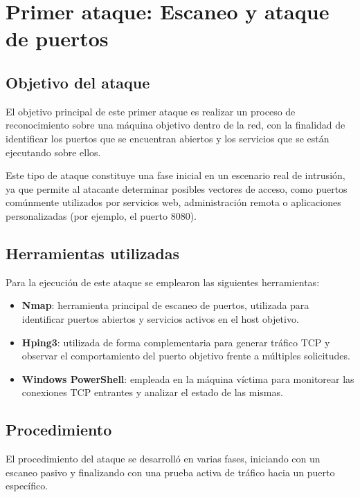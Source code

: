 \section{Primer ataque: Escaneo y ataque de puertos}

\subsection{Objetivo del ataque}

El objetivo principal de este primer ataque es realizar un proceso de reconocimiento sobre una máquina objetivo dentro de la red, con la finalidad de identificar los puertos que se encuentran abiertos y los servicios que se están ejecutando sobre ellos.

Este tipo de ataque constituye una fase inicial en un escenario real de intrusión, ya que permite al atacante determinar posibles vectores de acceso, como puertos comúnmente utilizados por servicios web, administración remota o aplicaciones personalizadas (por ejemplo, el puerto 8080).

\subsection{Herramientas utilizadas}

Para la ejecución de este ataque se emplearon las siguientes herramientas:

\begin{itemize}
    \item \textbf{Nmap}: herramienta principal de escaneo de puertos, utilizada para identificar puertos abiertos y servicios activos en el host objetivo.
    \item \textbf{Hping3}: utilizada de forma complementaria para generar tráfico TCP y observar el comportamiento del puerto objetivo frente a múltiples solicitudes.
    \item \textbf{Windows PowerShell}: empleada en la máquina víctima para monitorear las conexiones TCP entrantes y analizar el estado de las mismas.
\end{itemize}

\subsection{Procedimiento}

El procedimiento del ataque se desarrolló en varias fases, iniciando con un escaneo pasivo y finalizando con una prueba activa de tráfico hacia un puerto específico.

